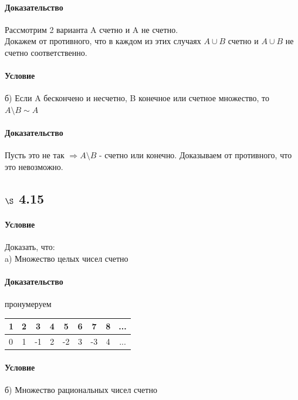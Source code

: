 \documentclass[a4paper,12pt]{article}
\begin{document}
\paragraph*{Доказательство}
Рассмотрим 2 варианта A счетно и A не счетно.\\
Докажем от противного, что в каждом из этих случаях $A \cup B$ счетно и $A \cup B$  не счетно соответственно.
\paragraph*{Условие}
б) Если A бескончено и несчетно, B конечное или счетное множество, то $ A \setminus B \sim A$
\paragraph*{Доказательство}
Пусть это не так $\Rightarrow A \setminus B$ - счетно или конечно. Доказываем от противного, что это невозможно.

\subsection*{$\S$ 4.15}
\paragraph*{Условие}
Доказать, что:\\
a) Множество целых чисел счетно
\paragraph*{Доказательство}
пронумеруем 
\begin{center}
  \begin{tabular}{ | l | c | c| c| c| c| c| c| c }
    \hline
    1 & 2 & 3  & 4 & 5  & 6 & 7  & 8 & ...\\ \hline
    0 & 1 & -1 & 2 & -2 & 3 & -3 & 4 & ...\\ \hline
  \end{tabular}
\end{center}
\paragraph*{Условие}
б) Множество рациональных чисел счетно
\end{document}
